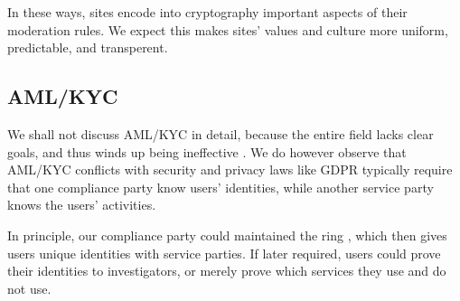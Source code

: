In these ways, sites encode into cryptography important aspects of
their moderation rules.  We expect this makes sites' values and culture
more uniform, predictable, and transperent.


\subsection{AML/KYC}

We shall not discuss AML/KYC in detail, because the entire field lacks
clear goals, and thus winds up being ineffective \cite{???}.
We do however observe that AML/KYC conflicts with security and privacy
laws like GDPR typically require that one compliance party know users'
identities, while another service party knows the users' activities.

In principle, our compliance party could maintained the ring \ctx,
which then gives users unique identities with service parties.
If later required, users could prove their identities to investigators,
or merely prove which services they use and do not use. 



